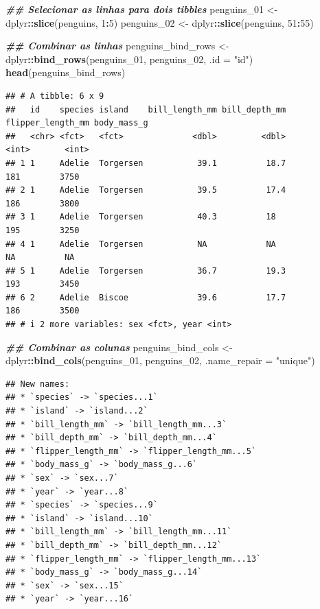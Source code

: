 \documentclass[
]{article}
\newenvironment{Shaded}{\begin{snugshade}}{\end{snugshade}}
\newcommand{\AttributeTok}[1]{\textcolor[rgb]{0.13,0.29,0.53}{#1}}
\newcommand{\DecValTok}[1]{\textcolor[rgb]{0.00,0.00,0.81}{#1}}
\newcommand{\DocumentationTok}[1]{\textcolor[rgb]{0.56,0.35,0.01}{\textbf{\textit{#1}}}}
\newcommand{\FunctionTok}[1]{\textcolor[rgb]{0.13,0.29,0.53}{\textbf{#1}}}
\newcommand{\NormalTok}[1]{#1}
\newcommand{\OtherTok}[1]{\textcolor[rgb]{0.56,0.35,0.01}{#1}}
\newcommand{\SpecialCharTok}[1]{\textcolor[rgb]{0.81,0.36,0.00}{\textbf{#1}}}
\newcommand{\StringTok}[1]{\textcolor[rgb]{0.31,0.60,0.02}{#1}}
\begin{document}
\begin{Shaded}
\begin{Highlighting}[]
\DocumentationTok{\#\# Selecionar as linhas para dois tibbles}
\NormalTok{penguins\_01 }\OtherTok{\textless{}{-}}\NormalTok{ dplyr}\SpecialCharTok{::}\FunctionTok{slice}\NormalTok{(penguins, }\DecValTok{1}\SpecialCharTok{:}\DecValTok{5}\NormalTok{)}
\NormalTok{penguins\_02 }\OtherTok{\textless{}{-}}\NormalTok{ dplyr}\SpecialCharTok{::}\FunctionTok{slice}\NormalTok{(penguins, }\DecValTok{51}\SpecialCharTok{:}\DecValTok{55}\NormalTok{)}

\DocumentationTok{\#\# Combinar as linhas}
\NormalTok{penguins\_bind\_rows }\OtherTok{\textless{}{-}}\NormalTok{ dplyr}\SpecialCharTok{::}\FunctionTok{bind\_rows}\NormalTok{(penguins\_01, penguins\_02, }\AttributeTok{.id =} \StringTok{"id"}\NormalTok{)}
\FunctionTok{head}\NormalTok{(penguins\_bind\_rows)}
\end{Highlighting}
\end{Shaded}

\begin{verbatim}
## # A tibble: 6 x 9
##   id    species island    bill_length_mm bill_depth_mm flipper_length_mm body_mass_g
##   <chr> <fct>   <fct>              <dbl>         <dbl>             <int>       <int>
## 1 1     Adelie  Torgersen           39.1          18.7               181        3750
## 2 1     Adelie  Torgersen           39.5          17.4               186        3800
## 3 1     Adelie  Torgersen           40.3          18                 195        3250
## 4 1     Adelie  Torgersen           NA            NA                  NA          NA
## 5 1     Adelie  Torgersen           36.7          19.3               193        3450
## 6 2     Adelie  Biscoe              39.6          17.7               186        3500
## # i 2 more variables: sex <fct>, year <int>
\end{verbatim}

\begin{Shaded}
\begin{Highlighting}[]
\DocumentationTok{\#\# Combinar as colunas}
\NormalTok{penguins\_bind\_cols }\OtherTok{\textless{}{-}}\NormalTok{ dplyr}\SpecialCharTok{::}\FunctionTok{bind\_cols}\NormalTok{(penguins\_01, penguins\_02, }\AttributeTok{.name\_repair =} \StringTok{"unique"}\NormalTok{)}
\end{Highlighting}
\end{Shaded}

\begin{verbatim}
## New names:
## * `species` -> `species...1`
## * `island` -> `island...2`
## * `bill_length_mm` -> `bill_length_mm...3`
## * `bill_depth_mm` -> `bill_depth_mm...4`
## * `flipper_length_mm` -> `flipper_length_mm...5`
## * `body_mass_g` -> `body_mass_g...6`
## * `sex` -> `sex...7`
## * `year` -> `year...8`
## * `species` -> `species...9`
## * `island` -> `island...10`
## * `bill_length_mm` -> `bill_length_mm...11`
## * `bill_depth_mm` -> `bill_depth_mm...12`
## * `flipper_length_mm` -> `flipper_length_mm...13`
## * `body_mass_g` -> `body_mass_g...14`
## * `sex` -> `sex...15`
## * `year` -> `year...16`
\end{verbatim}
\end{document}

